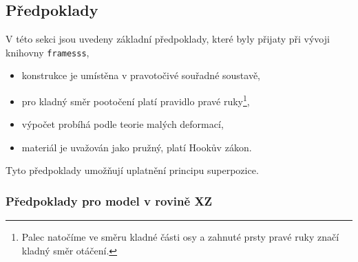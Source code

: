 \subsection{Předpoklady}

V této sekci jsou uvedeny základní předpoklady, které byly přijaty při vývoji knihovny \texttt{framesss},
\begin{itemize}
    \item konstrukce je umístěna v pravotočivé souřadné soustavě,
    \item pro kladný směr pootočení platí pravidlo pravé ruky\footnote{Palec natočíme ve směru kladné části osy a zahnuté prsty pravé ruky značí kladný směr otáčení.},
    \item výpočet probíhá podle teorie malých deformací,
    \item materiál je uvažován jako pružný, platí Hookův zákon.
\end{itemize}

Tyto předpoklady umožňují uplatnění principu superpozice.

\subsubsection*{Předpoklady pro model v rovině XZ}

